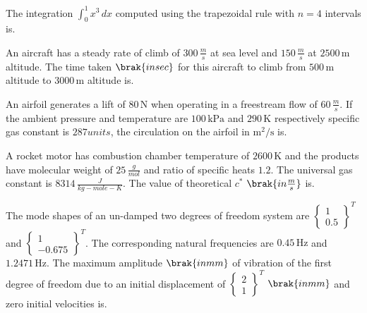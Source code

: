 
\iffalse
    \title{Assignment}
    \author{EE24BTECH11035}
    \section{ae}
    \chapter{2012}
  \fi
    \item The integration $ \int_0^1 x^3 \, dx $ computed using the trapezoidal rule with $ n = 4 $ intervals is.
    
    \item An aircraft has a steady rate of climb of $300 \, \frac{m}{s}$ at sea level and $150 \, \frac{m}{s}$ at $2500 \, \text{m}$ altitude. The time taken $\brak{in sec}$ for this aircraft to climb from $500 \, \text{m}$ altitude to $3000 \, \text{m}$ altitude is.
    
    \item An airfoil generates a lift of $80 \, \text{N}$ when operating in a freestream flow of $60 \, \frac{m}{s}$. If the ambient pressure and temperature are $100 \, \text{kPa}$ and $290 \, \text{K}$ respectively specific gas constant is $287 units$, the circulation on the airfoil in $ \text{m}^2/\text{s} $ is.
    
    \item A rocket motor has combustion chamber temperature of $2600 \, \text{K}$ and the products have molecular weight of $25 \, \frac{g}{mol}$ and ratio of specific heats $1.2$. The universal gas constant is $8314 \, \frac{J}{kg-mole-K}$. The value of theoretical $ c^* $ $\brak{in \frac{m}{s}}$ is.
    
    \item The mode shapes of an un-damped two degrees of freedom system are $ \begin{Bmatrix} 1 \\ 0.5 \end{Bmatrix}^T $ and $ \begin{Bmatrix} 1 \\ -0.675 \end{Bmatrix}^T $. The corresponding natural frequencies are $0.45 \, \text{Hz}$ and $1.2471 \, \text{Hz}$. The maximum amplitude $\brak{in mm}$ of vibration of the first degree of freedom due to an initial displacement of $ \begin{Bmatrix} 2 \\ 1 \end{Bmatrix}^T $ $\brak{in mm}$ and zero initial velocities is.
    

